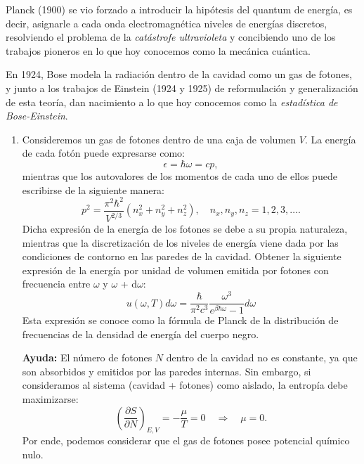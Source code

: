 \documentclass[a4paper,11pt]{article}
\begin{document}
Planck (1900) se vio forzado a introducir la hipótesis del quantum de 
energía, es decir, asignarle a cada onda electromagnética niveles de 
energías discretos, resolviendo el problema de la \emph{catástrofe 
ultravioleta} y concibiendo uno de los trabajos pioneros en lo que hoy 
conocemos como la mecánica cuántica.

En 1924, Bose modela la radiación dentro de la cavidad como un gas de 
fotones, y junto a los trabajos de Einstein (1924 y 1925) de reformulación y 
generalización de esta teoría, dan nacimiento a lo que hoy conocemos como la 
\emph{estadística de Bose-Einstein}.


\begin{enumerate}[label=(\alph*),
                  leftmargin=2\parindent,
                  rightmargin=2\parindent]

     \item{Consideremos un gas de fotones dentro de una caja de volumen $V$.
           La energía de cada fotón puede expresarse como:
           $$ \epsilon = \hbar \omega = c p , $$
           mientras que los autovalores de los momentos de cada uno de ellos 
           puede escribirse de la siguiente manera:
           $$
           p^2 = \frac{\pi^2 \hbar^2}{V^{2/3}}
           \left( n_x^2 + n_y^2 + n_z^2 \right), \quad
           n_x, n_y, n_z = 1, 2, 3, \dots .
           $$
           Dicha expresión de la energía de los fotones se debe a su propia 
           naturaleza, mientras que la discretización de los niveles de 
           energía viene dada por las condiciones de contorno en las paredes 
           de la cavidad.
           Obtener la siguiente expresión de  la energía por unidad de volumen 
           emitida por fotones con frecuencia entre $\omega$ y $\omega$ + 
           d$\omega$:
           $$
           u(\omega, T)d\omega = \frac{\hbar}{\pi^2 c^3}
           \frac{\omega^3}{e^{\beta \hbar \omega} - 1} d\omega
           $$
           Esta expresión se conoce como la fórmula de Planck de la 
           distribución de frecuencias de la densidad de energía del cuerpo 
           negro.
           }

     {\small
     \textbf{Ayuda:}
     El número de fotones $N$ dentro de la cavidad no es constante, ya que 
     son absorbidos y emitidos por las paredes internas.
     Sin embargo, si consideramos al sistema (cavidad + fotones) como aislado, 
     la entropía debe maximizarse:
     $$
     \left( \frac{\partial S}{\partial N} \right)_{E, V} =
     - \frac{\mu}{T} = 0 \quad \Rightarrow \quad \mu = 0.
     $$
     Por ende, podemos considerar que el gas de fotones posee potencial 
     químico nulo.
     }
     

\end{enumerate}
\end{document}
